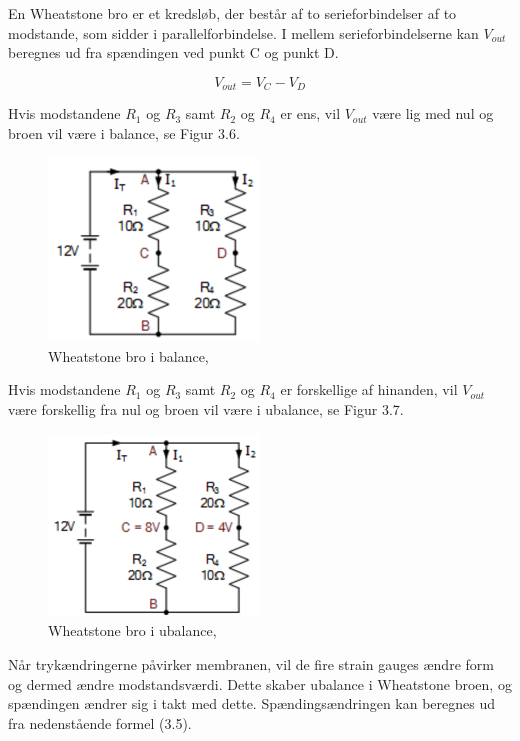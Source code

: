 En Wheatstone bro er et kredsløb, der består af to serieforbindelser af to modstande, som sidder i parallelforbindelse. I mellem serieforbindelserne kan $V_{out}$ beregnes ud fra spændingen ved punkt C og punkt D.

\begin{equation}
	V_{out} = V_{C} - V_{D}
\end{equation} 

Hvis modstandene $R_{1}$ og $R_{3}$ samt $R_{2}$ og $R_{4}$ er ens, vil $V_{out}$ være lig med nul og broen vil være i balance, se Figur 3.6. 

\begin{figure}[H]
	\centering
	\includegraphics[width=0.5\textwidth]{Figurer/Snip20151207_64}
	\caption{Wheatstone bro i balance, \protect\cite{Wheatestone}}
\end{figure}

Hvis modstandene $R_{1}$ og $R_{3}$ samt $R_{2}$ og $R_{4}$ er forskellige af hinanden, vil $V_{out}$ være forskellig fra nul og broen vil være i ubalance, se Figur 3.7. 

\begin{figure}[H]
	\centering
	\includegraphics[width=0.5\textwidth]{Figurer/Snip20151207_65}
	\caption{Wheatstone bro i ubalance, \protect\cite{Wheatestone}}
\end{figure}

Når trykændringerne påvirker membranen, vil de fire strain gauges ændre form og dermed ændre modstandsværdi. Dette skaber ubalance i Wheatstone broen, og spændingen ændrer sig i takt med dette. Spændingsændringen kan beregnes ud fra nedenstående formel (3.5).


